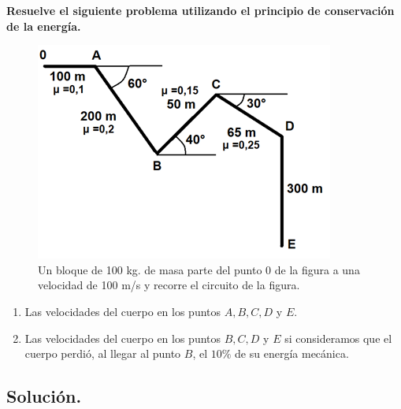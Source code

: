 \documentclass[a4paper,12pt]{article} %
\begin{document}
\begin{justify}
    \textbf{Resuelve el siguiente problema utilizando el principio de conservación de la energía.}
\end{justify}
\begin{figure}[h!]
    \centering
    \includegraphics[width=\textwidth]{problema 4.png}
    \caption{Un bloque de 100 kg. de masa parte del punto 0 de la figura a una velocidad de 100 m/s y recorre el circuito de la figura.}
\end{figure}

\begin{enumerate}
    \item Las velocidades del cuerpo en los puntos \(A, B, C, D\) y \(E\).
    \item Las velocidades del cuerpo en los puntos \(B, C, D\) y \(E\) si consideramos que el cuerpo perdió, al llegar al punto \(B\), el \(10\%\) de su energía mecánica.
\end{enumerate}


\newpage

\subsection*{Solución.}







\vspace{\baselineskip}

\hspace{0.5 cm}
\end{document}
